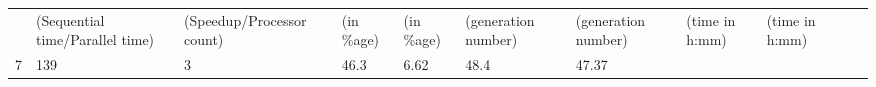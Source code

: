 \documentclass[]{article}
\begin{document}
\begin{longtable}[c]{@{}lllllllllll@{}}
\begin{minipage}[t]{0.07\columnwidth}
\strut\end{minipage} &
\begin{minipage}[t]{0.07\columnwidth}\raggedright\strut
(Sequential time/Parallel time)
\strut\end{minipage} &
\begin{minipage}[t]{0.07\columnwidth}\raggedright\strut
(Speedup/Processor count)
\strut\end{minipage} &
\begin{minipage}[t]{0.07\columnwidth}\raggedright\strut
(in \%age)
\strut\end{minipage} &
\begin{minipage}[t]{0.07\columnwidth}\raggedright\strut
(in \%age)
\strut\end{minipage} &
\begin{minipage}[t]{0.07\columnwidth}\raggedright\strut
(generation number)
\strut\end{minipage} &
\begin{minipage}[t]{0.07\columnwidth}\raggedright\strut
(generation number)
\strut\end{minipage} &
\begin{minipage}[t]{0.07\columnwidth}\raggedright\strut
(time in h:mm)
\strut\end{minipage} &
\begin{minipage}[t]{0.07\columnwidth}\raggedright\strut
(time in h:mm)
\strut\end{minipage}\tabularnewline
\begin{minipage}[t]{0.07\columnwidth}\raggedright\strut
7
\strut\end{minipage} &
\begin{minipage}[t]{0.07\columnwidth}\raggedright\strut
139
\strut\end{minipage} &
\begin{minipage}[t]{0.07\columnwidth}\raggedright\strut
3
\strut\end{minipage} &
\begin{minipage}[t]{0.07\columnwidth}\raggedright\strut
46.3
\strut\end{minipage} &
\begin{minipage}[t]{0.07\columnwidth}\raggedright\strut
6.62
\strut\end{minipage} &
\begin{minipage}[t]{0.07\columnwidth}\raggedright\strut
48.4
\strut\end{minipage} &
\begin{minipage}[t]{0.07\columnwidth}\raggedright\strut
47.37
\strut\end{minipage} &

\end{longtable}
\end{document}
